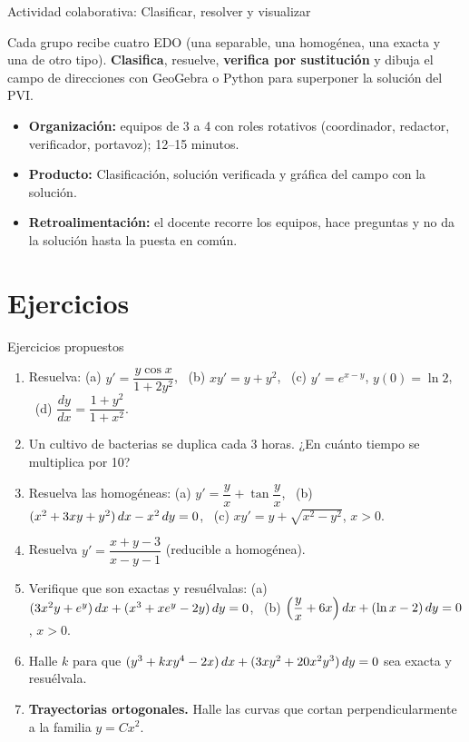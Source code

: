 \documentclass[10pt,aspectratio=169]{beamer}
\begin{document}
\begin{frame}{Actividad colaborativa: Clasificar, resolver y visualizar}
  \small
  \begin{activa}
    Cada grupo recibe cuatro EDO (una separable, una homogénea, una exacta y una de otro tipo). \textbf{Clasifica}, resuelve, \textbf{verifica por sustitución} y dibuja el campo de direcciones con GeoGebra o Python para superponer la solución del PVI.
  \end{activa}
  \begin{itemize}
    \item \textbf{Organización:} equipos de 3 a 4 con roles rotativos (coordinador, redactor, verificador, portavoz); 12--15 minutos.
    \item \textbf{Producto:} Clasificación, solución verificada y gráfica del campo con la solución.
    \item \textbf{Retroalimentación:} el docente recorre los equipos, hace preguntas y no da la solución hasta la puesta en común.
  \end{itemize}
\end{frame}

\section{Ejercicios}

\begin{frame}{Ejercicios propuestos}
  \small
  \begin{ejercicio}
    \begin{enumerate}
      \item Resuelva: (a) $y'=\dfrac{y\cos x}{1+2y^2}$, \ (b) $xy'=y+y^2$, \ (c) $y'=e^{x-y}$, $y(0)=\ln2$, \
        (d) $\dfrac{dy}{dx}=\dfrac{1+y^2}{1+x^2}$.
      \item Un cultivo de bacterias se duplica cada 3 horas. ¿En cuánto tiempo se multiplica por 10?
      \item Resuelva las homogéneas: (a) $y'=\dfrac{y}{x}+\tan\dfrac yx$, \ (b) $(x^2+3xy+y^2)\,dx-x^2\,dy=0$, \
        (c) $xy'=y+\sqrt{x^2-y^2}$, $x>0$.
      \item Resuelva $y'=\dfrac{x+y-3}{x-y-1}$ (reducible a homogénea).
      \item Verifique que son exactas y resuélvalas: (a) $(3x^2y+e^y)\,dx+(x^3+xe^y-2y)\,dy=0$, \
        (b) $\left(\dfrac{y}{x}+6x\right)dx+(\ln x-2)\,dy=0$, $x>0$.
      \item Halle $k$ para que $(y^3+kxy^4-2x)\,dx+(3xy^2+20x^2y^3)\,dy=0$ sea exacta y resuélvala.
      \item \textbf{Trayectorias ortogonales.} Halle las curvas que cortan perpendicularmente a la familia $y=Cx^2$.
    \end{enumerate}
  \end{ejercicio}
\end{frame}
\end{document}
